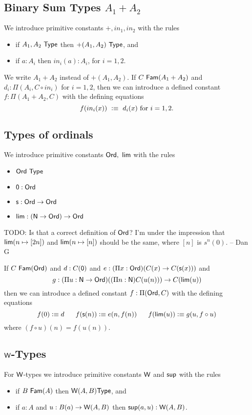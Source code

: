 {\medskip

\subsection*{Binary Sum Types $A_1+A_2$}
We introduce primitive constants $+,in_1,in_2$ with the rules
\begin{itemize}
\item if $A_1,A_2~{\sf Type}$ then $+(A_1,A_2)~{\sf Type}$, and
\item if $a:A_i$ then $in_i(a):A_i$, for $i=1,2$.
\end{itemize}
We write $A_1+A_2$ instead of $+(A_1,A_2)$.
If $C~{\sf Fam}(A_1+A_2)$ and $d_i:\Pi(A_i,C\circ in_i)$ for $i=1,2$,
then we can introduce a defined constant $f:\Pi(A_1+A_2,C)$ with the defining equations
  \[ f(in_i(x))~\vcentcolon\equiv ~d_i(x)\mbox{ for } i=1,2.\]

\subsection*{Types of ordinals}
We introduce primitive constants ${\sf Ord},~{\sf lim}$ with the rules
\begin{itemize}
\item ${\sf Ord}~{\sf Type}$
\item ${\sf 0}:{\sf Ord}$
\item ${\sf s}:{\sf Ord}\rightarrow{\sf Ord}$
\item ${\sf lim}:({\sf N}\rightarrow{\sf Ord})\rightarrow{\sf Ord}$
\end{itemize}

TODO: Is that a correct definition of ${\sf Ord}$?  I'm under the impression that ${\sf lim} ( n \mapsto [2n] )$
and ${\sf lim} ( n \mapsto [n] )$ should be the same, where $[n]$ is $s^n(0)$. -- Dan G

If $C~{\sf Fam}({\sf Ord})$ and $d:C({\sf 0})$ and $e:(\Pi x:{\sf Ord})(C(x)\rightarrow C({\sf s}(x)))$ and
$$g:(\Pi u:{\sf N}\rightarrow{\sf Ord})((\Pi n:{\sf N})C(u(n)))\rightarrow C({\sf lim}(u))$$
then we can introduce a defined constant $f:\Pi({\sf Ord},C)$ with the defining equations
$$
f(0) \vcentcolon\equiv d~~~~~f({\sf s}(n)) \vcentcolon\equiv e(n,f(n))~~~~~f({\sf lim}(u)) \vcentcolon\equiv g(u,f\circ u)
$$
where $(f\circ u)(n) = f(u(n))$.

\subsection*{${\sf W}$-Types}
For ${\sf W}$-types we introduce primitive constants ${\sf W}$ and ${\sf sup}$ with the rules
\begin{itemize}
\item if $B~{\sf Fam}(A)$ then ${\sf W}(A,B){\sf Type}$, and
\item if $a:A$ and $u:B(a)\rightarrow {\sf W}(A,B)$ then ${\sf sup}(a,u):{\sf W}(A,B)$.
\end{itemize}
 
}
